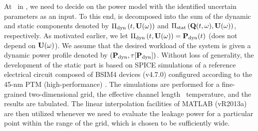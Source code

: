 At \ in , we need to decide on the power model with the identified uncertain parameters as an input.
To this end,  is decomposed into the sum of the dynamic and static components denoted by $\oPower{\dyn}{\t, \vU(\o)}$ and $\oPower{\stat}{\vTO(\t, \o), \vU(\o)}$, respectively.
As motivated earlier, we let $\oPower{\dyn}{\t, \vU(\o)} = \vP_\dyn(\t)$ (does not depend on $\mathbf{U}(\omega)$).
We assume that the desired workload of the system is given a dynamic power profile denoted by $\profilePdyn$.
Without loss of generality, the development of the static part is based on SPICE simulations of a reference electrical circuit composed of BSIM4 devices (v4.7.0) \cite{bsim} configured according to the 45-nm PTM (high-performance) \cite{ptm}.
The simulations are performed for a fine-grained two-dimensional grid, the effective channel length \versus\ temperature, and the results are tabulated.
The linear interpolation facilities of MATLAB (vR2013a) \cite{matlab} are then utilized whenever we need to evaluate the leakage power for a particular point within the range of the grid, which is chosen to be sufficiently wide.
